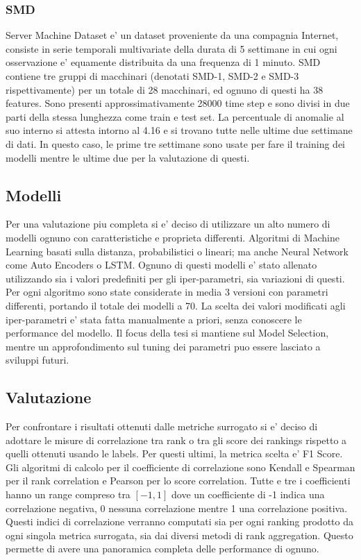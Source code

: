 \subsubsection{SMD}
Server Machine Dataset e' un dataset proveniente da una compagnia Internet, consiste in serie temporali multivariate della durata di 5 settimane in cui ogni osservazione e' equamente distribuita da una frequenza di 1 minuto. SMD contiene tre gruppi di macchinari (denotati SMD-1, SMD-2 e SMD-3 rispettivamente) per un totale di 28 macchinari, ed ognuno di questi ha 38 features. Sono presenti approssimativamente 28000 time step e sono divisi in due parti della stessa lunghezza come train e test set. 
La percentuale di anomalie al suo interno si attesta intorno al 4.16 e si trovano tutte nelle ultime due settimane di dati. In questo caso, le prime tre settimane sono usate per fare il training dei modelli mentre le ultime due per la valutazione di questi.



\subsection{Modelli}
Per una valutazione piu completa si e' deciso di utilizzare un alto numero di modelli ognuno con caratteristiche e proprieta differenti. Algoritmi di Machine Learning basati sulla distanza, probabilistici o lineari; ma anche Neural Network come Auto Encoders o LSTM.
Ognuno di questi modelli e' stato allenato utilizzando sia i valori predefiniti per gli iper-parametri, sia variazioni di questi. 
Per ogni algoritmo sono state considerate in media 3 versioni con parametri differenti, portando il totale dei modelli a 70.
La scelta dei valori modificati agli iper-parametri e' stata fatta manualmente a priori, senza conoscere le performance del modello. Il focus della tesi si mantiene sul Model Selection, mentre un approfondimento sul tuning dei parametri puo essere lasciato a sviluppi futuri.

\subsection{Valutazione}
Per confrontare i risultati ottenuti dalle metriche surrogato si e' deciso di adottare le misure di correlazione tra rank o tra gli score dei rankings rispetto a quelli ottenuti usando le labels. Per questi ultimi, la metrica scelta e' F1 Score.
Gli algoritmi di calcolo per il coefficiente di correlazione sono Kendall e Spearman per il rank correlation e Pearson per lo score correlation. Tutte e tre i coefficienti hanno un range compreso tra $[-1,1]$ dove un coefficiente di -1 indica una correlazione negativa, 0 nessuna correlazione mentre 1 una correlazione positiva.
Questi indici di correlazione verranno computati sia per ogni ranking prodotto da ogni singola metrica surrogata, sia dai diversi metodi di rank aggregation. Questo permette di avere una panoramica completa delle performance di ognuno.




